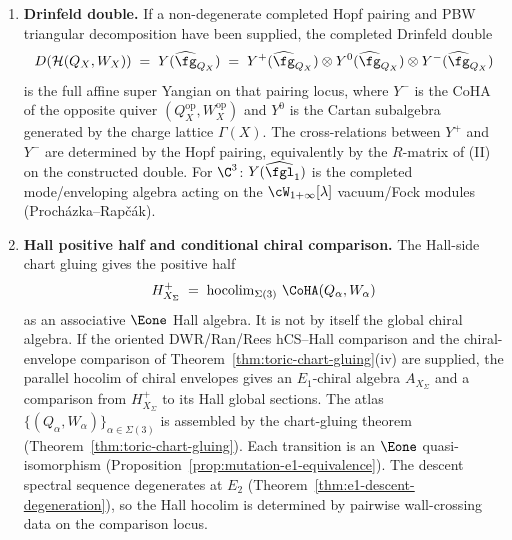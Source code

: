 \begin{theorem}
\begin{enumerate}[label=\textup{(\Roman*)}]
 \item \textbf{Drinfeld double.}
 If a non-degenerate completed Hopf pairing and PBW triangular
 decomposition have been supplied, the completed Drinfeld double
 \begin{equation}
 \label{eq:toric-drinfeld-double}
 D(\mathcal{H}(Q_X, W_X))
 \;=\; Y(\widehat{\fg}_{Q_X})
 \;=\; Y^+(\widehat{\fg}_{Q_X})
 \otimes Y^0(\widehat{\fg}_{Q_X})
 \otimes Y^-(\widehat{\fg}_{Q_X})
 \end{equation}
 is the full affine super Yangian on that pairing locus,
 where $Y^-$ is the CoHA of the opposite quiver
 $(Q_X^{\mathrm{op}}, W_X^{\mathrm{op}})$
 and $Y^0$ is the Cartan subalgebra
 generated by the charge lattice $\Gamma(X)$.
 The cross-relations between $Y^+$ and $Y^-$ are
 determined by the Hopf pairing, equivalently by the $R$-matrix of
 \textup{(II)} on the constructed double.
 For $\C^3$: $Y(\widehat{\fgl}_1)$ is the completed mode/enveloping
 algebra acting on the $\cW_{1+\infty}[\lambda]$ vacuum/Fock modules
 \textup{(}Proch\'azka--Rap\v{c}\'ak\textup{)}.

 \item \textbf{Hall positive half and conditional chiral comparison.}
 The Hall-side chart gluing gives the positive half
 \begin{equation}
 \label{eq:toric-global-chiral}
 H^+_{X_\Sigma}
 \;=\; \operatorname{hocolim}_{\Sigma(3)}\,
 \CoHA(Q_\alpha, W_\alpha)
 \end{equation}
 as an associative $\Eone$ Hall algebra. It is not by itself the
 global chiral algebra. If the oriented DWR/Ran/Rees hCS--Hall
 comparison and the chiral-envelope comparison of
 Theorem~\ref{thm:toric-chart-gluing}\textup{(iv)} are supplied, the
 parallel hocolim of chiral envelopes gives an $E_1$-chiral algebra
 $A_{X_\Sigma}$ and a comparison from $H^+_{X_\Sigma}$ to its Hall
 global sections. The atlas
 $\{(Q_\alpha, W_\alpha)\}_{\alpha \in \Sigma(3)}$ is assembled by the
 chart-gluing theorem
 \textup{(}Theorem~\textup{\ref{thm:toric-chart-gluing}}\textup{)}.
 Each transition is an $\Eone$ quasi-isomorphism
 \textup{(}Proposition~\textup{\ref{prop:mutation-e1-equivalence}}\textup{)}.
 The descent spectral sequence degenerates at $E_2$
 \textup{(}Theorem~\textup{\ref{thm:e1-descent-degeneration}}\textup{)},
 so the Hall hocolim is determined by pairwise wall-crossing data on
 the comparison locus.


\end{enumerate}
\end{theorem}
